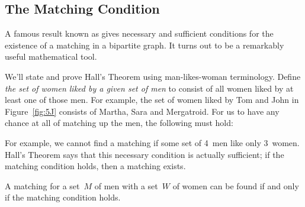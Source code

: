 \subsection{The Matching Condition}\label{match-condition}

A famous result known as  gives necessary
and sufficient conditions for the existence of a matching in a
bipartite graph.  It turns out to be a remarkably useful mathematical
tool.

We'll state and prove Hall's Theorem using man-likes-woman
terminology.  Define \emph{the set of women liked by a given set of
  men} to consist of all women liked by at least one of those men.
For example, the set of women liked by Tom and John in
Figure~\ref{fig:5J} consists of Martha, Sara and Mergatroid.  For us
to have any chance at all of matching up the men, the following
 must hold:

\medskip

\noindent{}

\medskip

For example, we cannot find a matching if some set of 4~men like only
3~women.  Hall's Theorem says that this necessary condition is
actually sufficient; if the matching condition holds, then a matching
exists.

\begin{theorem}\label{thm:matching}
  A matching for a set~$M$ of men with a set~$W$ of women can be found if
  and only if the matching condition holds.
\end{theorem}

